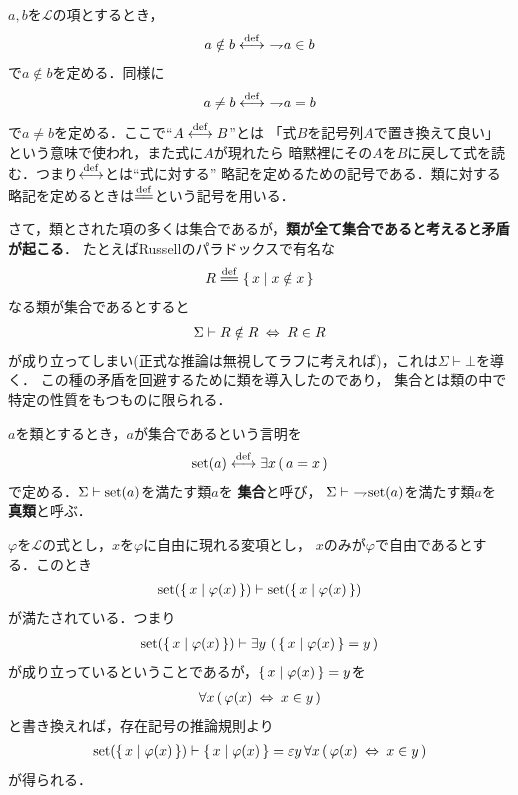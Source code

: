 	$a,b$を$\mathcal{L}$の項とするとき，
	\begin{align}
		a \notin b \overset{\mathrm{def}}{\longleftrightarrow}\ \rightharpoondown\hspace{-0.25em} a \in b
	\end{align}
	で$a \notin b$を定める．同様に
	\begin{align}
		a \neq b \overset{\mathrm{def}}{\longleftrightarrow}\ \rightharpoondown\hspace{-0.25em} a = b
	\end{align}
	で$a \neq b$を定める．ここで``$A \overset{\mathrm{def}}{\longleftrightarrow} B$''とは
	「式$B$を記号列$A$で置き換えて良い」という意味で使われ，また式に$A$が現れたら
	暗黙裡にその$A$を$B$に戻して式を読む．つまり$\overset{\mathrm{def}}{\longleftrightarrow}$とは``式に対する''
	略記を定めるための記号である．類に対する略記を定めるときは$\defeq$という記号を用いる．
	
	さて，類とされた項の多くは集合であるが，{\bf 類が全て集合であると考えると矛盾が起こる}．
	たとえばRussellのパラドックスで有名な
	\begin{align}
		R \defeq \Set{x}{x \notin x}
	\end{align}
	なる類が集合であるとすると
	\begin{align}
		\Sigma \vdash R \notin R \hspace{0.25em}\Leftrightarrow\hspace{0.25em} R \in R
	\end{align}
	が成り立ってしまい(正式な推論は無視してラフに考えれば)，これは$\Sigma \vdash \bot$を導く．
	この種の矛盾を回避するために類を導入したのであり，
	集合とは類の中で特定の性質をもつものに限られる．
	
	\begin{screen}
		\begin{dfn}[集合]
			$a$を類とするとき，$a$が集合であるという言明を
			\begin{align}
				\operatorname*{set} (a) \overset{\mathrm{def}}{\longleftrightarrow} \exists x\, (\, a = x\, )
			\end{align}
			で定める．$\Sigma \vdash \operatorname*{set} (a)$を満たす類$a$を
			{\bf 集合}と呼び，
			$\Sigma \vdash\ \rightharpoondown\hspace{-0.25em} \operatorname*{set} (a)$を満たす類$a$を
			{\bf 真類}と呼ぶ．
		\end{dfn}
	\end{screen}
	
	$\varphi$を$\mathcal{L}$の式とし，$x$を$\varphi$に自由に現れる変項とし，
	$x$のみが$\varphi$で自由であるとする．このとき
	\begin{align}
		\operatorname*{set} (\left\{\, x \mid \varphi(x)\, \right\}) \vdash \operatorname*{set} (\left\{\, x \mid \varphi(x)\, \right\})
	\end{align}
	が満たされている．つまり
	\begin{align}
		\operatorname*{set} (\left\{\, x \mid \varphi(x)\, \right\})
		\vdash \exists y\, \left(\, \left\{\, x \mid \varphi(x)\, \right\} = y\, \right)
	\end{align}
	が成り立っているということであるが，$\left\{\, x \mid \varphi(x)\, \right\} = y$を
	\begin{align}
		\forall x\, (\, \varphi(x) \hspace{0.25em}\Leftrightarrow\hspace{0.25em} x \in y\, )
	\end{align}
	と書き換えれば，存在記号の推論規則より
	\begin{align}
		\operatorname*{set} (\left\{\, x \mid \varphi(x)\, \right\}) \vdash \left\{\, x \mid \varphi(x)\, \right\} = 
		\varepsilon y\, \forall x\, (\, \varphi(x) \hspace{0.25em}\Leftrightarrow\hspace{0.25em} x \in y\, )
	\end{align}
	が得られる．
	
